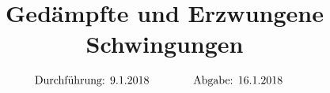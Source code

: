 

\subject{V354}
\title{Gedämpfte und Erzwungene Schwingungen}

\date{
  \begin{align}
    \text{Durchführung: } & \text{9.1.2018} & \hspace{3em} & \text{Abgabe: 16.1.2018} \notag
  \end{align}
}




\maketitle
\thispagestyle{empty}
\tableofcontents
\newpage






\nocite{*}
\printbibliography{}


